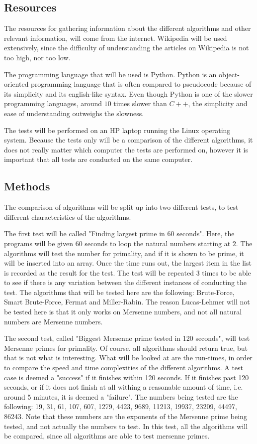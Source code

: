\documentclass[main.tex]{subfiles}
\begin{document}
\subsection{Resources}
The resources for gathering information about the different algorithms and other relevant information, will come from the internet. Wikipedia will be used extensively, since the difficulty of understanding the articles on Wikipedia is not too high, nor too low. 

The programming language that will be used is Python. Python is an object-oriented programming language that is often compared to pseudocode because of its simplicity and its english-like syntax. Even though Python is one of the slower programming languages, around $10$ times slower than $C++$, the simplicity and ease of understanding outweighs the slowness. 

The tests will be performed on an HP laptop running the Linux operating system. Because the tests only will be a comparison of the different algorithms, it does not really matter which computer the tests are performed on, however it is important that all tests are conducted on the same computer. 

\subsection{Methods}
The comparison of algorithms will be split up into two different tests, to test different characteristics of the algorithms. 

The first test will be called "Finding largest prime in 60 seconds". Here, the programs will be given 60 seconds to loop the natural numbers starting at $2$. The algorithms will test the number for primality, and if it is shown to be prime, it will be inserted into an array. Once the time runs out, the largest item in the list is recorded as the result for the test. The test will be repeated 3 times to be able to see if there is any variation between the different instances of conducting the test. The algorithms that will be tested here are the following: Brute-Force, Smart Brute-Force, Fermat and Miller-Rabin. The reason Lucas-Lehmer will not be tested here is that it only works on Mersenne numbers, and not all natural numbers are Mersenne numbers. 

The second test, called "Biggest Mersenne prime tested in 120 seconds", will test Mersenne primes for primality. Of course, all algorithms should return true, but that is not what is interesting. What will be looked at are the run-times, in order to compare the speed and time complexities of the different algorithms. A test case is deemed a "success" if it finishes within 120 seconds. If it finishes past 120 seconds, or if it does not finish at all withing a reasonable amount of time, i.e. around 5 minutes, it is deemed a "failure". The numbers being tested are the following: 19, 31, 61, 107, 607, 1279, 4423, 9689, 11213, 19937, 23209, 44497, 86243. Note that these numbers are the exponents of the Mersenne prime being tested, and not actually the numbers to test. In this test, all the algorithms will be compared, since all algorithms are able to test mersenne primes. 
\end{document}
